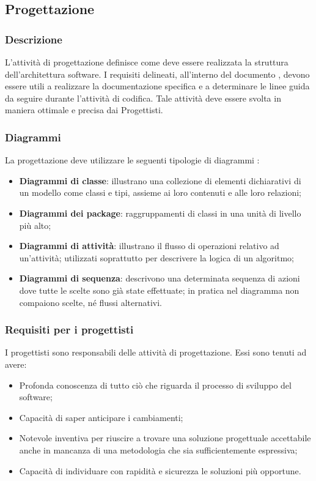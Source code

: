 \documentclass[../NormeDiProgetto.tex]{subfiles}
\begin{document}
      \subsection{Progettazione}
            \subsubsection{Descrizione}
            L'attività di progettazione definisce come deve essere realizzata la struttura dell'architettura software. I requisiti delineati, all'interno del documento \analisideirequisiti, devono essere utili a realizzare la documentazione specifica e a determinare le linee guida da seguire durante l'attività di codifica. Tale attività deve essere svolta in maniera ottimale e precisa dai Progettisti.

            \subsubsection{Diagrammi}
            La progettazione deve utilizzare le seguenti tipologie di diagrammi :
            \begin{itemize}
                  \item \textbf{Diagrammi di classe}: illustrano una collezione di elementi dichiarativi di un modello come classi e tipi, assieme ai loro contenuti e alle loro relazioni;
                  \item \textbf{Diagrammi dei package}: raggruppamenti di classi in una unità di livello più alto;
                  \item \textbf{Diagrammi di attività}: illustrano il flusso di operazioni relativo ad un'attività; utilizzati soprattutto per descrivere la logica di un algoritmo;
                  \item \textbf{Diagrammi di sequenza}: descrivono una determinata sequenza di azioni dove tutte le scelte sono già state effettuate; in pratica nel diagramma non compaiono scelte, né flussi alternativi.
            \end{itemize}

            \subsubsection{Requisiti per i progettisti}
            I progettisti sono responsabili delle attività di progettazione. Essi sono tenuti ad avere:
            \begin{itemize}
                  \item Profonda conoscenza di tutto ciò che riguarda il processo di sviluppo del software;
                  \item Capacità di saper anticipare i cambiamenti;
                  \item Notevole inventiva per riuscire a trovare una soluzione progettuale accettabile anche in mancanza di una metodologia che sia sufficientemente espressiva;
                  \item Capacità di individuare con rapidità e sicurezza le soluzioni più opportune.
            \end{itemize}
\end{document}
